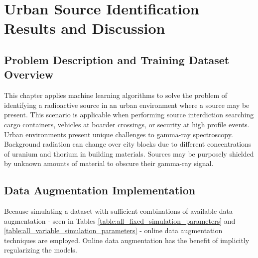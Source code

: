\chapter{Urban Source Identification Results and Discussion}







\section{Problem Description and Training Dataset Overview}

This chapter applies machine learning algorithms to solve the problem of identifying a radioactive source in an urban environment where a source may be present. This scenario is applicable when performing source interdiction searching cargo containers, vehicles at boarder crossings, or security at high profile events. Urban environments present unique challenges to gamma-ray spectroscopy. Background radiation can change over city blocks due to different concentrations of uranium and thorium in building materials. Sources may be purposely shielded by unknown amounts of material to obscure their gamma-ray signal.





\section{Data Augmentation Implementation}

Because simulating a dataset with sufficient combinations of available data augmentation - seen in Tables \ref{table:all_fixed_simulation_parameters} and \ref{table:all_variable_simulation_parameters} - online data augmentation techniques are employed. Online data augmentation has the benefit of implicitly regularizing the models.

